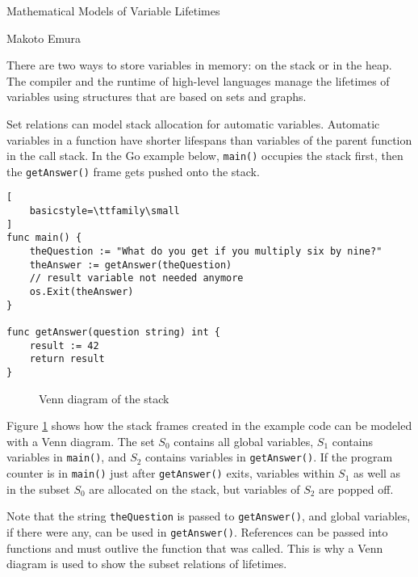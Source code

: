 \documentclass[11pt, letterpaper]{report}
\begin{document}
Mathematical Models of Variable Lifetimes

Makoto Emura

There are two ways to store variables in memory: on the stack or in the heap. The compiler and the runtime of high-level languages manage the lifetimes of variables using structures that are based on sets and graphs.

Set relations can model stack allocation for automatic variables. Automatic variables in a function have shorter lifespans than variables of the parent function in the call stack. In the Go example below, \lstinline{main()} occupies the stack first, then the \lstinline{getAnswer()} frame gets pushed onto the stack.

\begin{lstlisting}[
    basicstyle=\ttfamily\small
]
func main() {
	theQuestion := "What do you get if you multiply six by nine?"
	theAnswer := getAnswer(theQuestion)
	// result variable not needed anymore
	os.Exit(theAnswer)
}

func getAnswer(question string) int {
	result := 42
	return result
}
\end{lstlisting}

\begin{wrapfigure}{r}{0.35\textwidth}
    \begin{center}
        
        \caption{Venn diagram of the stack}
        \label{venn_diagram}
    \end{center}
\end{wrapfigure}


Figure \ref{venn_diagram} shows how the stack frames created in the example code can be modeled with a Venn diagram. The set $S_0$ contains all global variables, $S_1$ contains variables in \lstinline{main()}, and $S_2$ contains variables in \lstinline{getAnswer()}. If the program counter is in \lstinline{main()} just after \lstinline{getAnswer()} exits, variables within $S_1$ as well as in the subset $S_0$ are allocated on the stack, but  variables of $S_2$ are popped off.

Note that the string \lstinline{theQuestion} is passed to \lstinline{getAnswer()}, and global variables, if there were any, can be used in \lstinline{getAnswer()}. References can be passed into functions and must outlive the function that was called. This is why a Venn diagram is used to show the subset relations of lifetimes.
\end{document}
